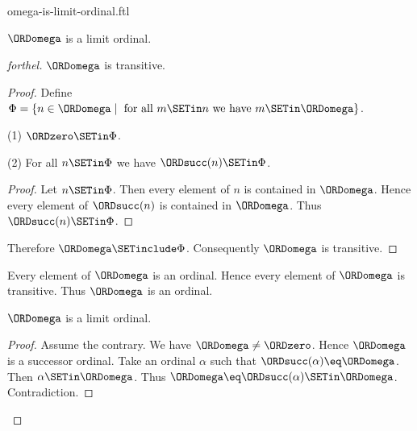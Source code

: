 \documentclass{naproche-library}
\begin{document}
\begin{smodule}[title=$\omega$ is a Limit Ordinal]{omega-is-limit-ordinal.ftl}

\begin{proposition}[forthel,id=SET_THEORY_03_764451995254784]
  $\ORDomega$ is a limit ordinal.
\end{proposition}
\begin{proof}[forthel]
  $\ORDomega$ is transitive.
  \begin{proof}
    Define $\Phi = \{ n \in \ORDomega \mid\text{ for all }m \SETin n\text{ we have }m \SETin \ORDomega \}$.

    (1) $\ORDzero \SETin \Phi$.

    (2) For all $n \SETin \Phi$ we have $\ORDsucc(n) \SETin \Phi$.
    \begin{proof}
      Let $n \SETin \Phi$.
      Then every element of $n$ is contained in $\ORDomega$.
      Hence every element of $\ORDsucc(n)$ is contained in $\ORDomega$.
      Thus $\ORDsucc(n) \SETin \Phi$.
    \end{proof}

    Therefore $\ORDomega \SETinclude \Phi$.
    Consequently $\ORDomega$ is transitive.
  \end{proof}

  Every element of $\ORDomega$ is an ordinal.
  Hence every element of $\ORDomega$ is transitive.
  Thus $\ORDomega$ is an ordinal.

  $\ORDomega$ is a limit ordinal.
  \begin{proof}
    Assume the contrary.
    We have $\ORDomega \neq \ORDzero$.
    Hence $\ORDomega$ is a successor ordinal.
    Take an ordinal $\alpha$ such that $\ORDsucc(\alpha) \eq \ORDomega$.
    Then $\alpha \SETin \ORDomega$.
    Thus $\ORDomega \eq \ORDsucc(\alpha) \SETin \ORDomega$.
    Contradiction.
  \end{proof}
\end{proof}
\end{smodule}
\end{document}
